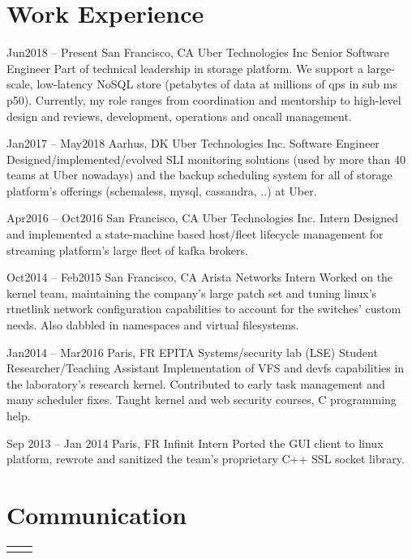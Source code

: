 \documentclass[
	10pt, %
]{freemancv}
\begin{document}
\begin{paracol}{2}
\section{Work Experience}
\jobentry
	{Jun2018 -- Present} %
	{San Francisco, CA} %
	{Uber Technologies Inc} %
	{Senior Software Engineer} %
	{
		Part of technical leadership in storage platform. We support a
		large-scale, low-latency NoSQL store (petabytes of data at
		millions of qps in sub ms p50). Currently, my role ranges from
		coordination and mentorship to high-level design and reviews,
		development, operations and oncall management.
	}

\jobentry
	{Jan2017 -- May2018} %
	{Aarhus, DK} %
	{Uber Technologies Inc.} %
	{Software Engineer} %
	{
		Designed/implemented/evolved SLI monitoring solutions (used by
		more than 40 teams at Uber nowadays) and the backup scheduling
		system for all of storage platform's offerings (schemaless,
		mysql, cassandra, ..) at Uber.
	}

\jobentry
	{Apr2016 -- Oct2016} %
	{San Francisco, CA} %
	{Uber Technologies Inc.} %
	{Intern} %
	{
		Designed and implemented a state-machine based host/fleet
		lifecycle management for streaming platform's large fleet of
		kafka brokers.
	}

\jobentry
	{Oct2014 -- Feb2015} %
	{San Francisco, CA} %
	{Arista Networks} %
	{Intern} %
	{
		Worked on the kernel team, maintaining the company's large
		patch set and tuning linux's rtnetlink network configuration
		capabilities to account for the switches' custom needs. Also
		dabbled in namespaces and virtual filesystems.
	}

\jobentry
	{Jan2014 -- Mar2016} %
	{Paris, FR} %
	{EPITA Systems/security lab (LSE)} %
	{Student Researcher/Teaching Assistant} %
	{
		Implementation of VFS and devfs capabilities in the
		laboratory's research kernel. Contributed to early task
		management and many scheduler fixes. Taught kernel and web
		security courses, C programming help.
	}

\jobentry
	{Sep 2013 -- Jan 2014} %
	{Paris, FR} %
	{Infinit} %
	{Intern} %
	{
		Ported the GUI client to linux platform, rewrote and sanitized
		the team's proprietary C++ SSL socket library.
	}

\section{Communication}
\begin{supertabular}{r l} %
\end{supertabular}
\end{paracol} %
\end{document}
